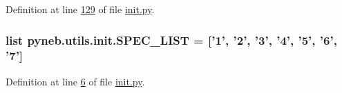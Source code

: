 Definition at line \hyperlink{init_8py_source_l00129}{129} of file \hyperlink{init_8py_source}{init.\-py}.

\hypertarget{namespacepyneb_1_1utils_1_1init_afd0ab6834d14e36c7ba2bfa6fdfbd386}{
\subsubsection[{S\-P\-E\-C\-\_\-\-L\-I\-S\-T}]{\setlength{\rightskip}{0pt plus 5cm}list pyneb.\-utils.\-init.\-S\-P\-E\-C\-\_\-\-L\-I\-S\-T = \mbox{[}'1', '2', '3', '4', '5', '6', '7'\mbox{]}}}\label{namespacepyneb_1_1utils_1_1init_afd0ab6834d14e36c7ba2bfa6fdfbd386}


Definition at line \hyperlink{init_8py_source_l00006}{6} of file \hyperlink{init_8py_source}{init.\-py}.

